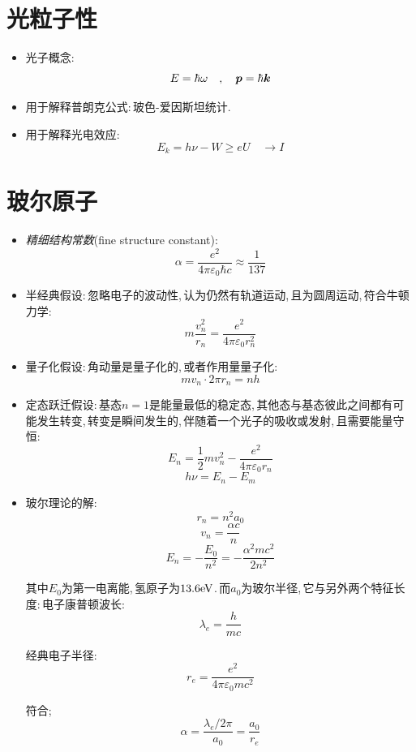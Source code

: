 \section{光粒子性}

\begin{itemize}
\item 光子概念:
\[E=\hbar\omega \quad ,\quad \boldsymbol{p}=\hbar \boldsymbol{k}\]

\item 用于解释普朗克公式:\,玻色-爱因斯坦统计.

\item 用于解释光电效应:
\[E_k=h\nu-W\geq eU\quad \rightarrow I\]
\end{itemize}

\section{玻尔原子}

\begin{itemize}
\item \emph{精细结构常数}(fine structure constant):
\[\alpha =\frac{e^2}{4\pi \varepsilon_0 \hbar c}\approx \frac{1}{137}\]

\item 半经典假设:\,忽略电子的波动性,\,认为仍然有轨道运动,\,且为圆周运动,\,符合牛顿力学:
\[m\frac{v_n^2}{r_n}=\frac{e^2
}{4\pi \varepsilon_0 r_n^2}\]

\item 量子化假设:\,角动量是量子化的,\,或者作用量量子化:
\[mv_n\cdot 2\pi r_n=nh\]

\item 定态跃迁假设:\,基态$n=1$是能量最低的稳定态,\,其他态与基态彼此之间都有可能发生转变,\,转变是瞬间发生的,\,伴随着一个光子的吸收或发射,\,且需要能量守恒:
\[E_n=\frac{1}{2}mv_n^2-\frac{e^2}{4\pi\varepsilon_0 r_n}\]
\[h\nu=E_n-E_m\]

\item 玻尔理论的解:
\[r_n=n^2 a_0\]
\[v_n=\frac{\alpha c}{n}\]
\[E_n=-\frac{E_0}{n^2}=-\frac{\alpha^2 mc^2}{2n^2}\]

其中$E_0$为第一电离能,\,氢原子为$13.6{\rm eV}$.\,而$a_0$为玻尔半径,\,它与另外两个特征长度:\,电子康普顿波长:
\[\lambda_e=\frac{h}{mc}\]

经典电子半径:
\[r_e=\frac{e^2}{4\pi\varepsilon_0 mc^2}\]

符合;
\[\alpha=\frac{\lambda_e/2\pi}{a_0}=\frac{a_0}{r_e}\]

\end{itemize}

